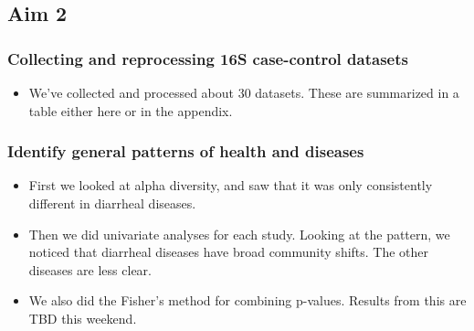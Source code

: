 \documentclass[12pt]{article}
\begin{document}
\subsection{Aim 2}
\subsubsection{Collecting and reprocessing 16S case-control datasets}

\begin{itemize}
\item We've collected and processed about 30 datasets. These are summarized in a table either here or in the appendix.
\end{itemize}

\subsubsection{Identify general patterns of health and diseases}

\begin{itemize}
\item First we looked at alpha diversity, and saw that it was only consistently 
different in diarrheal diseases.
\item Then we did univariate analyses for each study. Looking at the pattern, we noticed 
that diarrheal diseases have broad community shifts. The other diseases are less clear.
\item We also did the Fisher's method for combining p-values. Results from this are TBD this weekend.
\end{itemize}




\end{document}
